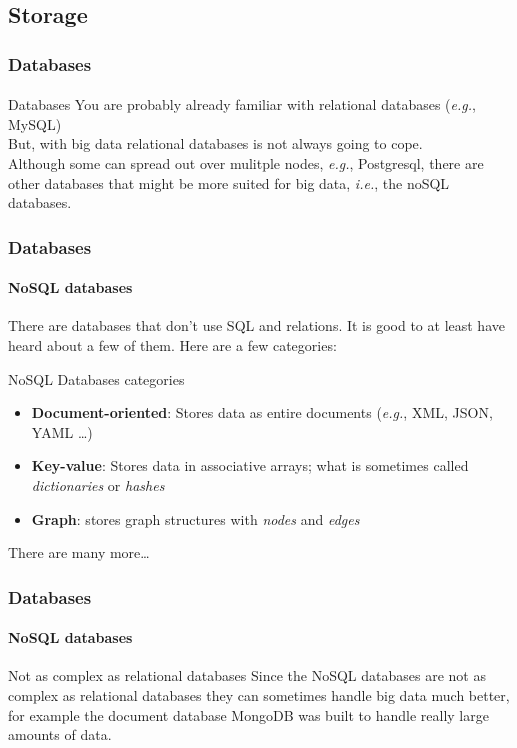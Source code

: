 \documentclass[aspectratio=169,dvipsnames]{beamer}
\begin{document}
\subsection{Storage}
    \begin{frame}
        \frametitle{Databases}
        \framesubtitle{}

        \begin{block}{Databases}
        \small
            You are probably already familiar with \alert{relational databases} (\textit{e.g.}, MySQL) \\[10pt]

            But, with big data \alert{relational databases is not always going to cope}.\\[10pt]


            Although some can spread out over mulitple nodes, \textit{e.g.},
            Postgresql, there are other databases that might be more suited for
            big data, \textit{i.e.}, the \alert{noSQL databases}.
        \end{block}
    \end{frame}
    
    \begin{frame}
        \frametitle{Databases}
        \framesubtitle{NoSQL databases}

        There are databases that don't use SQL and relations. It is good to at
        least have heard about a few of them. Here are a few categories:

        \begin{block}{NoSQL Databases categories}
        \small
        \begin{itemize}
        \item \textbf{Document-oriented}: Stores data as entire documents (\textit{e.g.}, XML, JSON, YAML \ldots)
        \item \textbf{Key-value}: Stores data in associative arrays; what is sometimes
                         called \textit{dictionaries} or \textit{hashes}
        \item \textbf{Graph}: stores graph structures with \textit{nodes} and \textit{edges}
        \end{itemize}
        \end{block}
        There are many more\ldots
    \end{frame}
    
    \begin{frame}
        \frametitle{Databases}
        \framesubtitle{NoSQL databases}
        \begin{block}{Not as complex as relational databases}
            Since the \alert{NoSQL databases} are not as complex as relational
            databases they \alert{can sometimes handle big data much better}, for
            example the document database MongoDB was built to handle really
            large amounts of data.
        \end{block}
    \end{frame}
\end{document}
